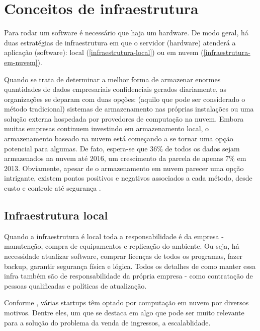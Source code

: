 \chapter{Conceitos de infraestrutura}

Para rodar um software é necessário que haja um hardware. De modo geral,
há duas estratégias de infraestrutura em que o servidor (hardware) atenderá a aplicação (software):
local (\autoref{infraestrutura-local}) ou em nuvem (\autoref{infraestrutura-em-nuvem}).

\begin{citacao}

Quando se trata de determinar a melhor forma de armazenar enormes quantidades de
dados empresariais confidenciais gerados diariamente, as organizações se deparam
com duas opções: (aquilo que pode ser considerado o método tradicional) sistemas
de armazenamento nas próprias instalações ou uma solução externa hospedada por
provedores de computação na nuvem. Embora muitas empresas continuem investindo
em armazenamento local, o armazenamento baseado na nuvem está começando a se
tornar uma opção potencial para algumas. De fato, espera-se que 36\% de todos
os dados sejam armazenados na nuvem até 2016, um crescimento da parcela de
apenas 7\% em 2013. Obviamente, apesar de o armazenamento em nuvem parecer
uma opção intrigante, existem pontos positivos e negativos associados a cada
método, desde custo e controle até segurança \cite{armazenamento-no-local-ou-na-nuvem}.

\end{citacao}

\section{Infraestrutura local}\label{infraestrutura-local}

Quando a infraestrutura é local toda a responsabilidade é da empresa - manutenção,
compra de equipamentos e replicação do ambiente.
Ou seja, há necessidade atualizar software, comprar licenças de todos os programas,
fazer backup, garantir segurança física e lógica.
Todos os detalhes de como manter essa infra também são de responsabilidade da própria empresa -
como contratação de pessoas qualificadas e políticas de atualização.

Conforme \cite{beneficios-da-computacao-em-nuvem-para-sua-startup}, várias startups
têm optado por computação em nuvem por diversos motivos. Dentre eles, um que se destaca
em algo que pode ser muito relevante para a solução do problema da venda de ingressos,
a escalablidade.

